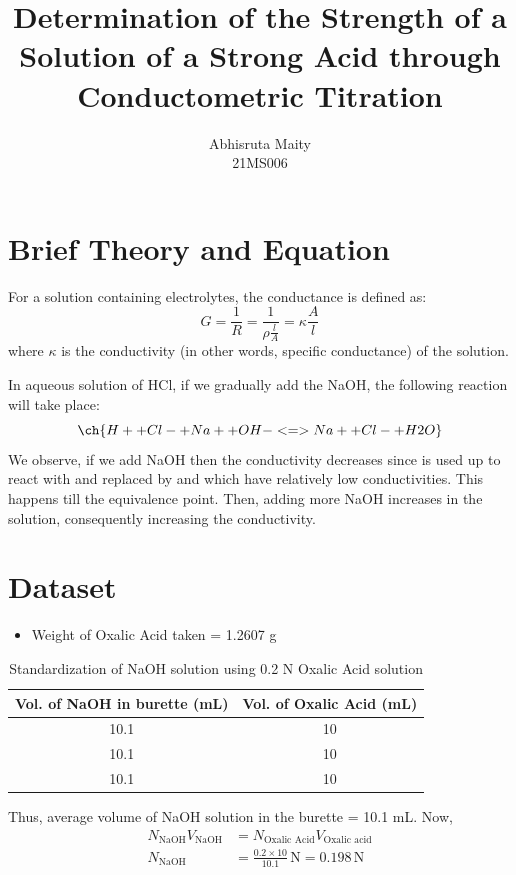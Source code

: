 \documentclass[11pt, a4paper, abstract=true]{scrartcl}
\begin{document}
\subject{CH1202: Lab Report IV}
\title{
\huge Determination of the Strength of a Solution of a Strong Acid through Conductometric Titration
}
\author{
Abhisruta Maity \\
{\normalsize 21MS006}
}
\date{}
\publishers{
\normalsize \emph{Indian Institute of Science Education and Research, Kolkata \\
Mohanpur, West Bengal, 741246, India}
}
\maketitle
\tableofcontents

\section{Brief Theory and Equation}

For a solution containing electrolytes, the conductance is defined as: \[G = \frac{1}{R} = \frac{1}{\rho \frac{l}{A}} = \kappa \frac{A}{l}\] where \(\kappa\) is the conductivity (in other words, specific conductance) of the solution.

In aqueous solution of HCl, if we gradually add the NaOH, the following reaction will take place: \[\ch{H+ + Cl- + Na+ + OH- <=> Na+ + Cl- + H2O}\] We observe, if we add NaOH then the conductivity decreases since  is used up to react with  and replaced by  and  which have relatively low conductivities. This happens till the equivalence point. Then, adding more NaOH increases  in the solution, consequently increasing the conductivity.
\section{Dataset}

\begin{itemize}
    \item Weight of Oxalic Acid taken = 1.2607 g
\end{itemize}

\begin{table}[H]
    \centering
    \begin{tabular}{|c|c|}
    \hline
    Vol. of NaOH in burette (mL) & Vol. of Oxalic Acid (mL)\\ \hline
    10.1                    & 10                  \\ \hline
    10.1                    & 10                  \\ \hline
    10.1                    & 10                  \\ \hline
    \end{tabular}
    \caption{Standardization of NaOH solution using 0.2 N Oxalic Acid solution}
\end{table}
Thus, average volume of NaOH solution in the burette = 10.1 mL. Now, \begin{align*}
    N_{\text{NaOH}}V_{\text{NaOH}} &= N_{\text{Oxalic Acid}}V_{\text{Oxalic acid}} \\ N_{\text{NaOH}} &= \frac{0.2 \times 10}{10.1} \, \text{N} = 0.198 \, \text{N}\\ 
\end{align*}
\end{document}
